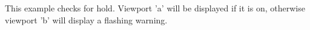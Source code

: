 \begin{example}
\end{example}
This example checks for hold. Viewport 'a' will be displayed if it is on,
otherwise viewport 'b' will display a flashing warning.
